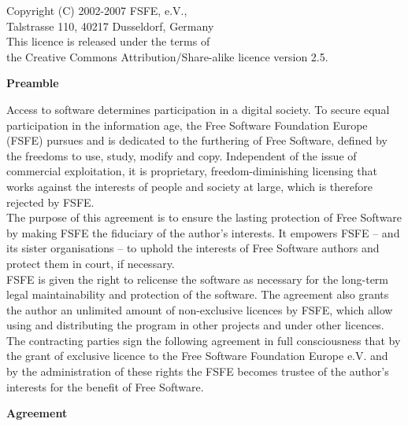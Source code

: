 \begin{center}
\sc\small Copyright (C) 2002-2007 FSFE, e.V.,\\
\sc\small Talstrasse 110,
40217 Dusseldorf,
Germany\\
\sc\small This licence is released under the terms of\\
the Creative Commons Attribution/Share-alike licence version 2.5.
\end{center}


\begin{center}
{\Large\bf Preamble}
\end{center}
 
Access to software determines participation in a digital society. To
secure equal participation in the information age, the Free Software
Foundation Europe (FSFE) pursues and is dedicated to the furthering of
Free Software, defined by the freedoms to use, study, modify and
copy. Independent of the issue of commercial exploitation, it is
proprietary, freedom-diminishing licensing that works against the
interests of people and society at large, which is therefore rejected
by FSFE.\\

The purpose of this agreement is to ensure the lasting protection of
Free Software by making FSFE the fiduciary of the author's interests.
It empowers FSFE -- and its sister organisations -- to uphold the
interests of Free Software authors and protect them in court, if
necessary.\\

FSFE is given the right to relicense the software as necessary for the
long-term legal maintainability and protection of the software. The
agreement also grants the author an unlimited amount of non-exclusive
licences by FSFE, which allow using and distributing the program in
other projects and under other licences. \\

The contracting parties sign the following agreement in full
consciousness that by the grant of exclusive licence to the Free
Software Foundation Europe e.V. and by the administration of these
rights the FSFE becomes trustee of the author's interests for
the benefit of Free Software.\\ 

\pagebreak
\begin{center}
{\Large\bf Agreement}
\end{center}

